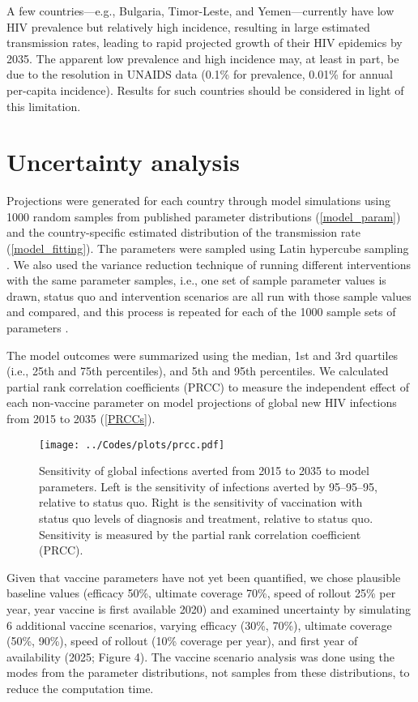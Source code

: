 \documentclass{article}
\begin{document}
A few countries—e.g., Bulgaria, Timor-Leste, and Yemen—currently have
low HIV prevalence but relatively high incidence, resulting in large
estimated transmission rates, leading to rapid projected growth of
their HIV epidemics by 2035. The apparent low prevalence and high
incidence may, at least in part, be due to the resolution in UNAIDS
data (0.1\% for prevalence, 0.01\% for annual per-capita incidence).
Results for such countries should be considered in light of this
limitation.


\section{Uncertainty analysis}
\label{uncertainty}

Projections were generated for each country through model simulations
using 1000 random samples from published parameter distributions
(\autoref{model_param}) and the country-specific estimated
distribution of the transmission rate (\autoref{model_fitting}). The
parameters were sampled using Latin hypercube sampling
\cite{blower1994}.  We also used the variance reduction technique of
running different interventions with the same parameter samples, i.e.,
one set of sample parameter values is drawn, status quo and
intervention scenarios are all run with those sample values and
compared, and this process is repeated for each of the 1000 sample
sets of parameters \cite{shechter2006}.

The model outcomes were summarized using the median, 1st and 3rd
quartiles (i.e., 25th and 75th percentiles), and 5th and 95th
percentiles.  We calculated partial rank correlation coefficients
(PRCC) \cite{blower1994} to measure the independent effect of each
non-vaccine parameter on model projections of global new HIV
infections from 2015 to 2035 (\autoref{PRCCs}).

\begin{figure}
  \centering
  \texttt{[image: ../Codes/plots/prcc.pdf]}
  \caption{Sensitivity of global infections averted from 2015 to 2035
    to model parameters.  Left is the sensitivity of infections
    averted by 95--95--95, relative to status quo.  Right is the
    sensitivity of vaccination with status quo levels of diagnosis and
    treatment, relative to status quo.  Sensitivity is measured by the
    partial rank correlation coefficient (PRCC).}
  \label{PRCCs}
\end{figure}

Given that vaccine parameters have not yet been quantified, we chose
plausible baseline values (efficacy 50\%, ultimate coverage 70\%,
speed of rollout 25\% per year, year vaccine is first available 2020)
and examined uncertainty by simulating 6 additional vaccine scenarios,
varying efficacy (30\%, 70\%), ultimate coverage (50\%, 90\%), speed
of rollout (10\% coverage per year), and first year of availability
(2025; Figure 4).  The vaccine scenario analysis was done using the
modes from the parameter distributions, not samples from these
distributions, to reduce the computation time.
\end{document}
